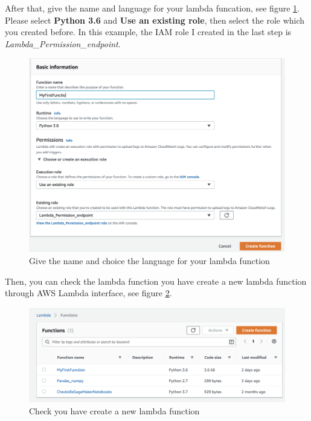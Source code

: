 \documentclass[12pt]{article}
\begin{document}
\noindent
After that, give the name and language for your lambda funcation, see figure \ref{fig:create_lambda_2}. Please select \textbf{Python 3.6} and \textbf{Use an existing role}, then select the role which you created before. In this example, the IAM role I created in the last step is \textit{Lambda\_Permission\_endpoint}.
\begin{figure}[H]
\centering
\begin{minipage}{1\textwidth}
  \centering
  \includegraphics[width=1\linewidth]{create_lambda_2.png}
   \caption{Give the name and choice the language for your lambda function}
   \label{fig:create_lambda_2}
\end{minipage}%
\end{figure}

\noindent
Then, you can check the lambda function you have create a new lambda function through AWS Lambda interface, see figure \ref{fig:check_function}. 

\begin{figure}[H]
\centering
\begin{minipage}{1\textwidth}
  \centering
  \includegraphics[width=1\linewidth]{check_function.png}
   \caption{Check you have create a new lambda function}
   \label{fig:check_function}
\end{minipage}%
\end{figure}
\end{document}
